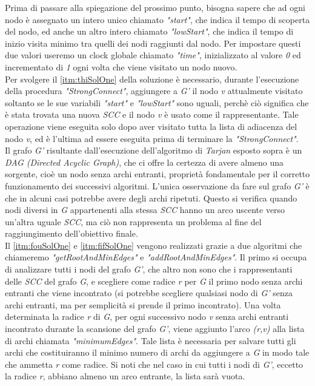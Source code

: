 \documentclass[10pt,a4paper,oneside,article,italian]{memoir}
\theoremstyle{definition}
\begin{document}
Prima di passare alla spiegazione del prossimo punto, bisogna sapere che ad ogni nodo è assegnato un intero unico chiamato \textit{"start"}, che indica il tempo di scoperta del nodo, ed anche un altro intero chiamato \textit{"lowStart"}, che indica il tempo di inizio visita minimo tra quelli dei nodi raggiunti dal nodo. Per impostare questi due valori useremo un clock globale chiamato \textit{"time"}, inizializzato al valore \textit{0} ed incrementato di \textit{1} ogni volta che viene visitato un nodo nuovo.\\
Per svolgere il \cref{itm:thiSolOne} della soluzione è necessario, durante l'esecuzione della procedura \textit{"StrongConnect"}, aggiungere a \textit{G'} il nodo \textit{v} attualmente visitato soltanto se le sue variabili \textit{"start"} e \textit{"lowStart"} sono uguali, perchè ciò significa che è stata trovata una nuova \textit{SCC} e il nodo \textit{v} è usato come il rappresentante. Tale operazione viene eseguita solo dopo aver visitato tutta la lista di adiacenza del nodo \textit{v}, ed è l'ultima ad essere eseguita prima di terminare la \textit{"StrongConnect"}.\\
Il grafo \textit{G'} risultante dall'esecuzione dell'algoritmo di \textit{Tarjan} esposto sopra è un \textit{DAG (Directed Acyclic Graph)}, che ci offre la certezza di avere almeno una sorgente, cioè un nodo senza archi entranti, proprietà fondamentale per il corretto funzionamento dei successivi algoritmi. L'unica osservazione da fare sul grafo \textit{G'} è che in alcuni casi potrebbe avere degli archi ripetuti. Questo si verifica quando nodi diversi in \textit{G} appartenenti alla stessa \textit{SCC} hanno un arco uscente verso un'altra uguale \textit{SCC}, ma ciò non rappresenta un problema al fine del raggiungimento dell'obiettivo finale.\\
Il \cref{itm:fouSolOne} e \ref{itm:fifSolOne} vengono realizzati grazie a due algoritmi che chiameremo \textit{"getRootAndMinEdges"} e \textit{"addRootAndMinEdges"}. Il primo si occupa di analizzare tutti i nodi del grafo \textit{G'}, che altro non sono che i rappresentanti delle \textit{SCC} del grafo \textit{G}, e scegliere come radice \textit{r} per \textit{G} il primo nodo senza archi entranti che viene incontrato (si potrebbe scegliere qualsiasi nodo di \textit{G'} senza archi entranti, ma per semplicità si prende il primo incontrato). Una volta determinata la radice \textit{r} di \textit{G}, per ogni successivo nodo \textit{v} senza archi entranti incontrato durante la scansione del grafo \textit{G'}, viene aggiunto l'arco \textit{(r,v)} alla lista di archi chiamata \textit{"minimumEdges"}. Tale lista è necessaria per salvare tutti gli archi che costituiranno il minimo numero di archi da aggiungere a \textit{G} in modo tale che ammetta \textit{r} come radice. Si noti che nel caso in cui tutti i nodi di \textit{G'}, eccetto la radice \textit{r}, abbiano almeno un arco entrante, la lista sarà vuota.\\
\end{document}
